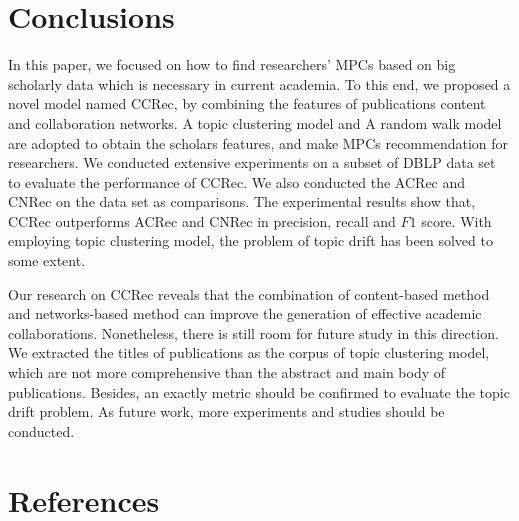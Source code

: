 \documentclass[review]{elsarticle}
\begin{document}
\section{Conclusions}
In this paper, we focused on how to find researchers' MPCs based on big scholarly data which is necessary in current academia. To this end, we proposed a novel model named CCRec, by combining the features of publications content and collaboration networks. A topic clustering model and A random walk model are adopted to obtain the scholars features, and make MPCs recommendation for researchers. We conducted extensive experiments on a subset of DBLP data set to evaluate the performance of CCRec. We also conducted the ACRec and CNRec on the data set as comparisons. The experimental results show that, CCRec outperforms ACRec and CNRec in precision, recall and $F1$ score. With employing topic clustering model, the problem of topic drift has been solved to some extent.

Our research on CCRec reveals that the combination of content-based method and networks-based method can improve the generation of effective academic collaborations. Nonetheless, there is still room for future study in this direction. We extracted the titles of publications as the corpus of topic clustering model, which are not more comprehensive than the abstract and main body of publications. Besides, an exactly metric should be confirmed to evaluate the topic drift problem. As future work, more experiments and studies should be conducted.

\section*{References}


\end{document}
